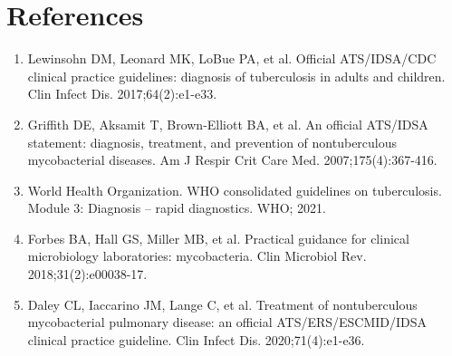 \section*{References}
\begin{enumerate}
  \item Lewinsohn DM, Leonard MK, LoBue PA, et al. Official ATS/IDSA/CDC clinical practice guidelines: diagnosis of tuberculosis in adults and children. Clin Infect Dis. 2017;64(2):e1-e33.
  \item Griffith DE, Aksamit T, Brown-Elliott BA, et al. An official ATS/IDSA statement: diagnosis, treatment, and prevention of nontuberculous mycobacterial diseases. Am J Respir Crit Care Med. 2007;175(4):367-416.
  \item World Health Organization. WHO consolidated guidelines on tuberculosis. Module 3: Diagnosis -- rapid diagnostics. WHO; 2021.
  \item Forbes BA, Hall GS, Miller MB, et al. Practical guidance for clinical microbiology laboratories: mycobacteria. Clin Microbiol Rev. 2018;31(2):e00038-17.
  \item Daley CL, Iaccarino JM, Lange C, et al. Treatment of nontuberculous mycobacterial pulmonary disease: an official ATS/ERS/ESCMID/IDSA clinical practice guideline. Clin Infect Dis. 2020;71(4):e1-e36.
\end{enumerate}

\clearpage
